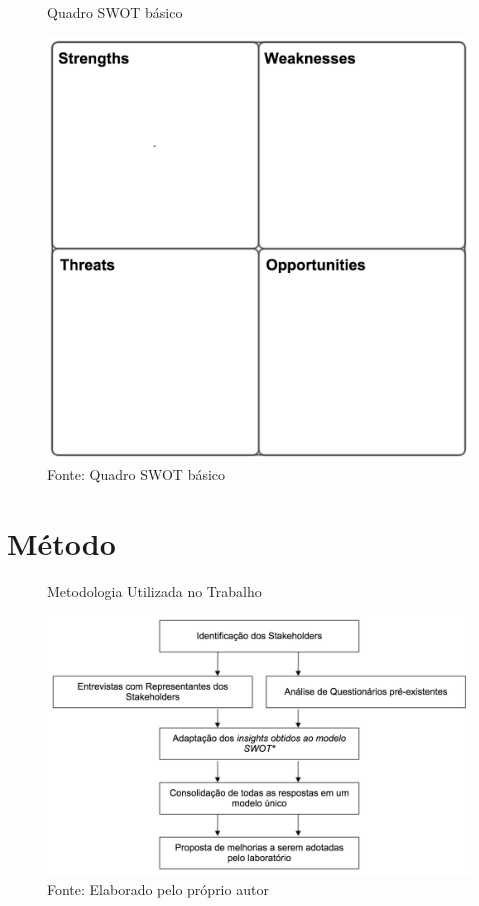 \begin{figure}[H]
\caption{Quadro SWOT básico}
\centerline{\includegraphics[scale=0.5]{img/detailedswot}}
\label{fig:detailedswot}
\caption* {Fonte: Quadro SWOT básico}
\end{figure}

\section{Método}

\label{chap:metodologia}

\begin{figure}[h]
\caption{Metodologia Utilizada no Trabalho}
\centerline{\includegraphics[scale=0.5]{img/metodologia}}
\label{fig:metodologia}
\caption* {Fonte: Elaborado pelo próprio autor}
\end{figure}

